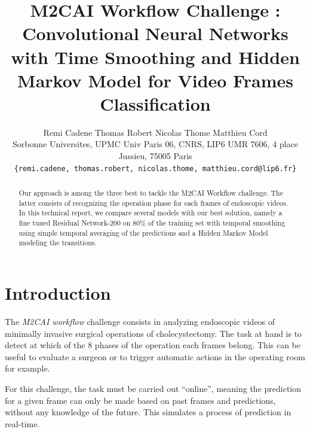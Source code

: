 \documentclass[10pt,twocolumn,letterpaper]{article}
\begin{document}
\title{M2CAI Workflow Challenge : Convolutional Neural Networks with Time Smoothing and Hidden Markov Model for Video Frames Classification}

\author{Remi Cadene \hspace{1cm} Thomas Robert \hspace{1cm} Nicolas Thome \hspace{1cm} Matthieu Cord\\
Sorbonne Universites, UPMC Univ Paris 06, CNRS, LIP6 UMR 7606, 4 place Jussieu, 75005 Paris\\
{\tt\small \{remi.cadene, thomas.robert, nicolas.thome, matthieu.cord@lip6.fr\}}
}

\maketitle

\begin{abstract}
Our approach is among the three best to tackle the M2CAI Workflow challenge. The latter consists of recognizing the operation phase for each frames of endoscopic videos. In this technical report, we compare several models with our best solution, namely a fine tuned Residual Network-200 on 80\% of the training set with temporal smoothing using simple temporal averaging of the predictions and a Hidden Markov Model modeling the transitions.
\end{abstract}

\section{Introduction}

The \emph{M2CAI workflow} challenge consists in analyzing endoscopic videos of
minimally invasive surgical operations of cholecystectomy. The task at hand is
to detect at which of the 8 phases of the operation each frames belong. This can
be useful to evaluate a surgeon or to trigger automatic actions in the operating
room for example.

For this challenge, the task must be carried out ``online'', meaning the prediction
for a given frame can only be made based on past frames and predictions, without
any knowledge of the future. This simulates a process of prediction in real-time.
\end{document}
